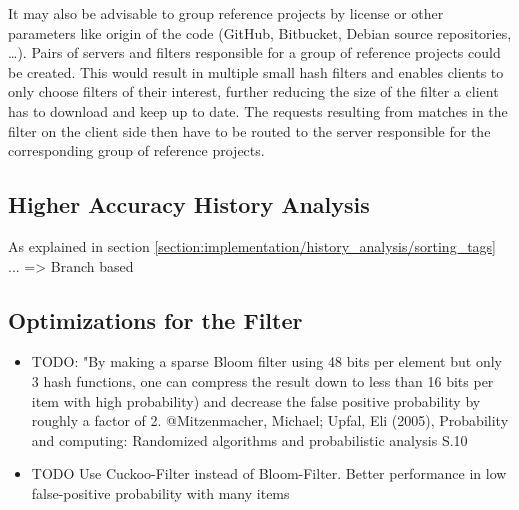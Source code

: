 It may also be advisable to group reference projects by license or other parameters like origin of the code (GitHub, Bitbucket, Debian source repositories, \dots).
Pairs of servers and filters responsible for a group of reference projects could be created.
This would result in multiple small hash filters and enables clients to only choose filters of their interest, further reducing the size of the filter a client has to download and keep up to date.
The requests resulting from matches in the filter on the client side then have to be routed to the server responsible for the corresponding group of reference projects.

\subsection{Higher Accuracy History Analysis}
As explained in section \ref{section:implementation/history_analysis/sorting_tags} ... => Branch based

\subsection{Optimizations for the Filter}
\begin{itemize}
\item TODO: "By making a sparse Bloom filter using 48 bits per element but only 3 hash functions, one can compress the result down to less than 16 bits per item with high probability) and decrease the false positive probability by roughly a factor of 2. @Mitzenmacher, Michael; Upfal, Eli (2005), Probability and computing: Randomized algorithms and probabilistic analysis S.10
\item TODO Use Cuckoo-Filter \cite{fan2014cuckoo} instead of Bloom-Filter. Better performance in low false-positive probability with many items
\end{itemize}